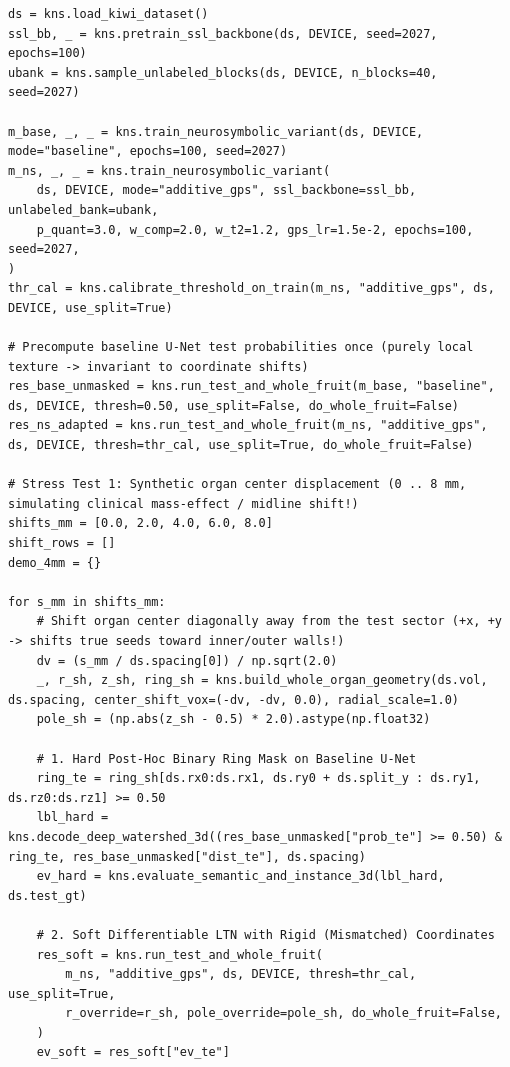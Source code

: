 \documentclass[10pt,a4paper]{article}
\renewcommand{\_}{\origunderscore\allowbreak}
\begin{document}
\begin{codebox}
\begin{lstlisting}[style=pybmed]
ds = kns.load_kiwi_dataset()
ssl_bb, _ = kns.pretrain_ssl_backbone(ds, DEVICE, seed=2027, epochs=100)
ubank = kns.sample_unlabeled_blocks(ds, DEVICE, n_blocks=40, seed=2027)

m_base, _, _ = kns.train_neurosymbolic_variant(ds, DEVICE, mode="baseline", epochs=100, seed=2027)
m_ns, _, _ = kns.train_neurosymbolic_variant(
    ds, DEVICE, mode="additive_gps", ssl_backbone=ssl_bb, unlabeled_bank=ubank,
    p_quant=3.0, w_comp=2.0, w_t2=1.2, gps_lr=1.5e-2, epochs=100, seed=2027,
)
thr_cal = kns.calibrate_threshold_on_train(m_ns, "additive_gps", ds, DEVICE, use_split=True)

# Precompute baseline U-Net test probabilities once (purely local texture -> invariant to coordinate shifts)
res_base_unmasked = kns.run_test_and_whole_fruit(m_base, "baseline", ds, DEVICE, thresh=0.50, use_split=False, do_whole_fruit=False)
res_ns_adapted = kns.run_test_and_whole_fruit(m_ns, "additive_gps", ds, DEVICE, thresh=thr_cal, use_split=True, do_whole_fruit=False)

# Stress Test 1: Synthetic organ center displacement (0 .. 8 mm, simulating clinical mass-effect / midline shift!)
shifts_mm = [0.0, 2.0, 4.0, 6.0, 8.0]
shift_rows = []
demo_4mm = {}

for s_mm in shifts_mm:
    # Shift organ center diagonally away from the test sector (+x, +y -> shifts true seeds toward inner/outer walls!)
    dv = (s_mm / ds.spacing[0]) / np.sqrt(2.0)
    _, r_sh, z_sh, ring_sh = kns.build_whole_organ_geometry(ds.vol, ds.spacing, center_shift_vox=(-dv, -dv, 0.0), radial_scale=1.0)
    pole_sh = (np.abs(z_sh - 0.5) * 2.0).astype(np.float32)

    # 1. Hard Post-Hoc Binary Ring Mask on Baseline U-Net
    ring_te = ring_sh[ds.rx0:ds.rx1, ds.ry0 + ds.split_y : ds.ry1, ds.rz0:ds.rz1] >= 0.50
    lbl_hard = kns.decode_deep_watershed_3d((res_base_unmasked["prob_te"] >= 0.50) & ring_te, res_base_unmasked["dist_te"], ds.spacing)
    ev_hard = kns.evaluate_semantic_and_instance_3d(lbl_hard, ds.test_gt)

    # 2. Soft Differentiable LTN with Rigid (Mismatched) Coordinates
    res_soft = kns.run_test_and_whole_fruit(
        m_ns, "additive_gps", ds, DEVICE, thresh=thr_cal, use_split=True,
        r_override=r_sh, pole_override=pole_sh, do_whole_fruit=False,
    )
    ev_soft = res_soft["ev_te"]


\end{lstlisting}
\end{codebox}
\end{document}
